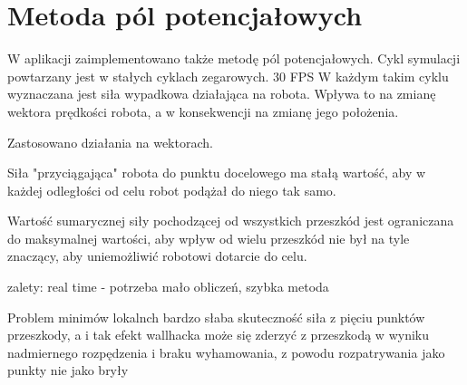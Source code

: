 \section{Metoda pól potencjałowych}
\label{ch:potential-fields}

W aplikacji zaimplementowano także metodę pól potencjałowych.
Cykl symulacji powtarzany jest w stałych cyklach zegarowych.
30 FPS
W każdym takim cyklu wyznaczana jest siła wypadkowa działająca na robota.
Wpływa to na zmianę wektora prędkości robota, a w konsekwencji na zmianę jego położenia.

Zastosowano działania na wektorach.

Siła "przyciągająca" robota do punktu docelowego ma stałą wartość, aby w każdej odległości od celu robot podążał do niego tak samo.

Wartość sumarycznej siły pochodzącej od wszystkich przeszkód jest ograniczana do maksymalnej wartości, aby wpływ od wielu przeszkód nie był na tyle znaczący, aby uniemożliwić robotowi dotarcie do celu.


zalety: real time - potrzeba mało obliczeń, szybka metoda

Problem minimów lokalnch
bardzo słaba skuteczność
siła z pięciu punktów przeszkody, a i tak efekt wallhacka
może się zderzyć z przeszkodą w wyniku nadmiernego rozpędzenia i braku wyhamowania, z powodu rozpatrywania jako punkty nie jako bryły